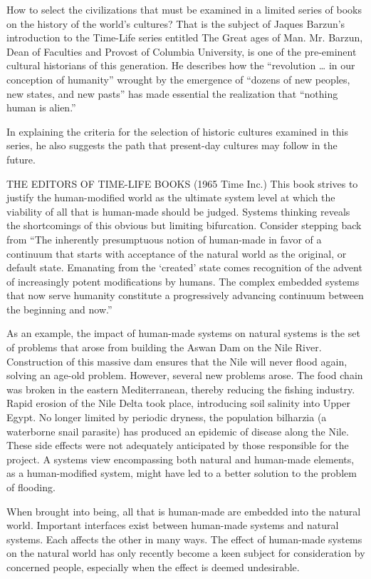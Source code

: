 How to select the civilizations that must be examined in a limited series of books on the history of the world’s cultures?  That is the subject of Jaques Barzun’s introduction to the Time-Life series entitled The Great ages of Man. Mr. Barzun, Dean of Faculties and Provost of Columbia University, is one of the pre-eminent cultural historians of this generation. He describes how the “revolution … in our conception of humanity” wrought by the emergence of “dozens of new peoples, new states, and new pasts” has made essential the realization that “nothing human is alien.”

In explaining the criteria for the selection of historic cultures examined in this series, he also suggests the path that present-day cultures may follow in the future.

THE EDITORS OF TIME-LIFE BOOKS (1965 Time Inc.) This book strives to justify the human-modified world as the ultimate system level at which the viability of all that is human-made should be judged. Systems thinking reveals the shortcomings of this obvious but limiting bifurcation. Consider stepping back from “The inherently presumptuous notion of human-made in favor of a continuum that starts with acceptance of the natural world as the original, or default state. Emanating from the ‘created’ state comes recognition of the advent of increasingly potent modifications by humans. The complex embedded systems that now serve humanity constitute a progressively advancing continuum between the beginning and now.”

As an example, the impact of human-made systems on natural systems is the set of problems that arose from building the Aswan Dam on the Nile River. Construction of this massive dam ensures that the Nile will never flood again, solving an age-old problem. However, several new problems arose. The food chain was broken in the eastern Mediterranean, thereby reducing the fishing industry. Rapid erosion of the Nile Delta took place, introducing soil salinity into Upper Egypt. No longer limited by periodic dryness, the population bilharzia (a waterborne snail parasite) has produced an epidemic of disease along the Nile. These side effects were not adequately anticipated by those responsible for the project. A systems view encompassing both natural and human-made elements, as a human-modified system, might have led to a better solution to the problem of flooding.

When brought into being, all that is human-made are embedded into the natural world. Important interfaces exist between human-made systems and natural systems. Each affects the other in many ways. The effect of human-made systems on the natural world has only recently become a keen subject for consideration by concerned people, especially when the effect is deemed undesirable.

